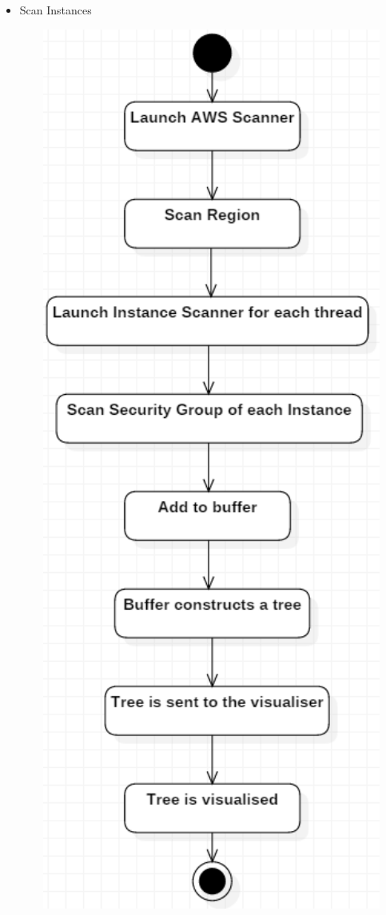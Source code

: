 \documentclass[a4paper,12pt]{report}
\begin{document}
\begin{itemize}
\begin{center}
		\end{center}
	\item Scan Instances
	\begin{center}
		\includegraphics[width=1\textwidth] {./Diagrams/ScanInstancesSequence.png}\\[0.4cm]
	\end{center}
\end{itemize}
\end{document}
